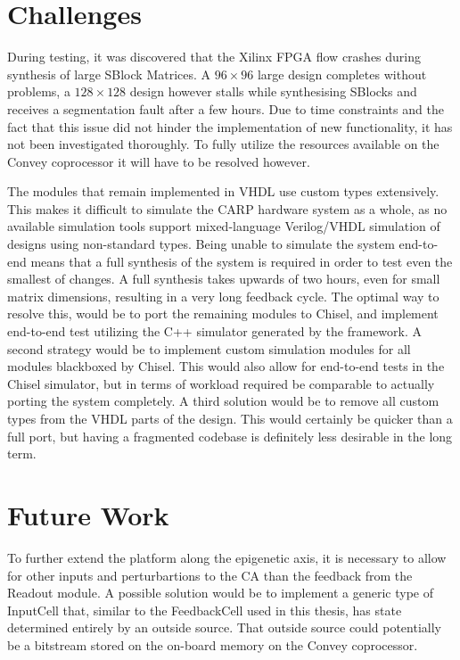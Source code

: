 \renewcommand{\arraystretch}{1}


\section{Challenges}

During testing, it was discovered that the Xilinx FPGA flow crashes during
synthesis of large SBlock Matrices. A $96\times96$ large design completes without
problems, a $128\times128$ design however stalls while synthesising SBlocks and
receives a segmentation fault after a few hours. Due to time constraints and the
fact that this issue did not hinder the implementation of new functionality, it
has not been investigated thoroughly. To fully utilize the resources available on the
Convey coprocessor it will have to be resolved however.

The modules that remain implemented in VHDL use custom types extensively. This
makes it difficult to simulate the CARP hardware system as a whole, as no
available simulation tools support mixed-language Verilog/VHDL simulation of
designs using non-standard types. Being unable to simulate the system end-to-end
means that a full synthesis of the system is required in order to test even the
smallest of changes. A full synthesis takes upwards of two hours, even for small
matrix dimensions, resulting in a very long feedback cycle. The optimal way to
resolve this, would be to port the remaining modules to Chisel, and implement
end-to-end test utilizing the C++ simulator generated by the framework. A second
strategy would be to implement custom simulation modules for all modules
blackboxed by Chisel. This would also allow for end-to-end tests in the Chisel
simulator, but in terms of workload required be comparable to actually porting
the system completely. A third solution would be to remove all custom types from
the VHDL parts of the design. This would certainly be quicker than a full port,
but having a fragmented codebase is definitely less desirable in the long term.

\section{Future Work}

To further extend the platform along the epigenetic axis, it is necessary to
allow for other inputs and perturbartions to the CA than the feedback from the
Readout module. A possible solution would be to implement a generic type of
InputCell that, similar to the FeedbackCell used in this thesis, has state
determined entirely by an outside source. That outside source could potentially
be a bitstream stored on the on-board memory on the Convey coprocessor.

